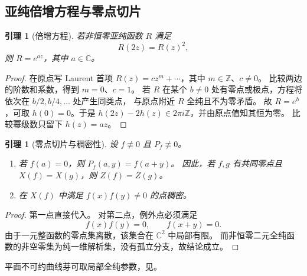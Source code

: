 \documentclass[11pt,a4paper,oneside,openany]{book}
\theoremstyle{lecture}
\newtheorem{lemma}[theorem]{引理}
\newcommand{\C}{\mathbb C}
\newcommand{\Z}{\mathbb Z}
\numberwithin{equation}{section}
\begin{document}
\subsection{亚纯倍增方程与零点切片}
\begin{lemma}[倍增方程]\label{an:lem:doubling}
若非恒零亚纯函数 $R$ 满足
\[
 R(2z)=R(z)^2,
\]
则 $R=e^{az}$，其中 $a\in\C$。
\end{lemma}
\begin{proof}
在原点写 Laurent 首项 $R(z)=cz^m+\cdots$，其中 $m\in\Z$、$c\ne0$。
比较两边的阶数和系数，得到 $m=0$、$c=1$。
若 $R$ 在某个 $b\ne0$ 处有零点或极点，方程将依次在 $b/2,b/4,\ldots$ 处产生同类点，
与原点附近 $R$ 全纯且不为零矛盾。
故 $R=e^h$，可取 $h(0)=0$。于是
$h(2z)-2h(z)\in2\pi i\Z$，并由原点值知其恒为零。
比较幂级数只留下 $h(z)=az$。
\end{proof}

\begin{lemma}[零点切片与稠密性]\label{an:lem:slices}
设 $f\not\equiv0$ 且 $P_f\not\equiv0$。
\begin{enumerate}[label=(\roman*)]
\item 若 $f(a)=0$，则 $P_f(a,y)=f(a+y)$。
因此，若 $f,g$ 有共同零点且 $X(f)=X(g)$，则 $Z(f)=Z(g)$。
\item 在 $X(f)$ 中满足 $f(x)f(y)\ne0$ 的点稠密。
\end{enumerate}
\end{lemma}
\begin{proof}
第一点直接代入。
对第二点，例外点必须满足
\[
 f(x)f(y)=0,\qquad f(x+y)=0.
\]
由于一元整函数的零点集离散，该集合在 $\C^2$ 中局部有限。
而非恒零二元全纯函数的非空零集为纯一维解析集，没有孤立分支，故结论成立。
\end{proof}

平面不可约曲线芽可取局部全纯参数，见\cite[\S\,5.8.1]{glutsyuk}。
\end{document}
